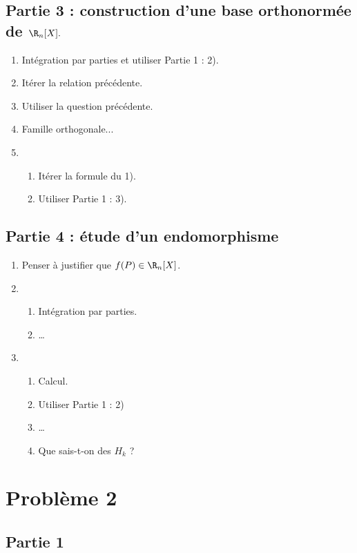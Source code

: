 \documentclass[twoside,french,10pt]{VcCours}
\begin{document}
\subsection*{Partie 3 : construction d'une base orthonormée de $\R_n[X].$}

\begin{enumerate}
	\item Intégration par parties et utiliser Partie 1 : 2).
	\item Itérer la relation précédente.
	\item Utiliser la question précédente. 
	\item Famille orthogonale...
	\item
	\begin{enumerate}
		\item Itérer la formule du 1).
		\item Utiliser Partie 1 : 3).
	\end{enumerate}
\end{enumerate}

\subsection*{Partie 4 : étude d'un endomorphisme}

\begin{enumerate}
	\item Penser à justifier que $f(P)\in\R_{n}[X]$.
	\item 
	\begin{enumerate}
		\item Intégration par parties.
		\item \ldots
	\end{enumerate}
	\item  
	\begin{enumerate}
		\item Calcul. 
		\item Utiliser Partie 1 : 2)
		\item \ldots
		\item Que sais-t-on des $H_k$ ?
	\end{enumerate}
\end{enumerate}

\section*{Problème 2}

\subsection*{Partie 1}
\end{document}
